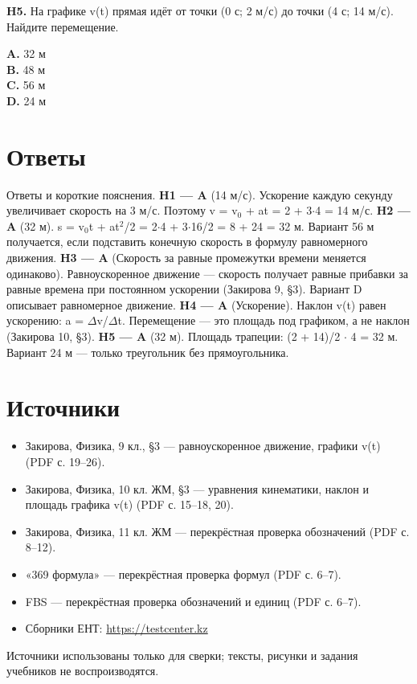 \documentclass[11pt]{article}
\begin{document}
\textbf{H5.} На графике v(t) прямая идёт от точки (0 с; 2 м/с) до точки (4 с; 14 м/с). Найдите перемещение.

\textbf{A.} 32 м \\
\textbf{B.} 48 м \\
\textbf{C.} 56 м \\
\textbf{D.} 24 м
\clearpage
\section*{Ответы}
Ответы и короткие пояснения.
\textbf{H1 — A} (14 м/с). Ускорение каждую секунду увеличивает скорость на 3 м/с. Поэтому v = v$_0$ + at = 2 + 3$\cdot$4 = 14 м/с.
\textbf{H2 — A} (32 м). s = v$_0$t + at$^2$/2 = 2$\cdot$4 + 3$\cdot$16/2 = 8 + 24 = 32 м. Вариант 56 м получается, если подставить конечную скорость в формулу равномерного движения.
\textbf{H3 — A} (Скорость за равные промежутки времени меняется одинаково). Равноускоренное движение — скорость получает равные прибавки за равные времена при постоянном ускорении (Закирова 9, §3). Вариант D описывает равномерное движение.
\textbf{H4 — A} (Ускорение). Наклон v(t) равен ускорению: a = $\Delta$v/$\Delta$t. Перемещение — это площадь под графиком, а не наклон (Закирова 10, §3).
\textbf{H5 — A} (32 м). Площадь трапеции: (2 + 14)/2 $\cdot$ 4 = 32 м. Вариант 24 м — только треугольник без прямоугольника.
\section*{Источники}
\begin{itemize}
\item Закирова, Физика, 9 кл., §3 — равноускоренное движение, графики v(t) (PDF с. 19–26).
\item Закирова, Физика, 10 кл. ЖМ, §3 — уравнения кинематики, наклон и площадь графика v(t) (PDF с. 15–18, 20).
\item Закирова, Физика, 11 кл. ЖМ — перекрёстная проверка обозначений (PDF с. 8–12).
\item «369 формула» — перекрёстная проверка формул (PDF с. 6–7).
\item FBS — перекрёстная проверка обозначений и единиц (PDF с. 6–7).
\item Сборники ЕНТ: \url{https://testcenter.kz}
\end{itemize}
Источники использованы только для сверки; тексты, рисунки и задания учебников не воспроизводятся.
\end{document}
